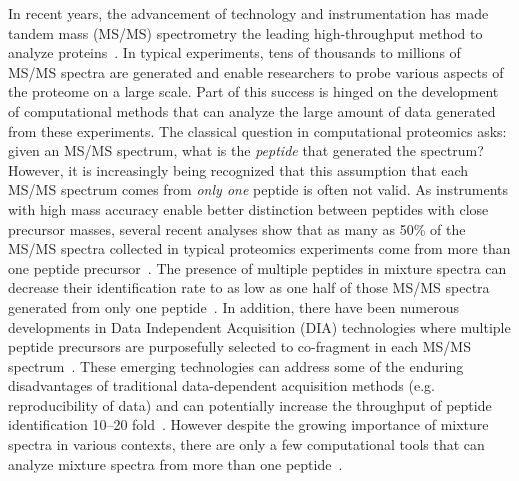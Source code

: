 \documentclass[runningheads,a4paper]{llncs}
\begin{document}
In recent years, the advancement of technology and instrumentation has made tandem mass (MS/MS) spectrometry the leading high-throughput method to analyze proteins~\cite{washburn2001large,brunner2007high,aebersold2003mass}.  In typical experiments, tens of thousands to millions of MS/MS spectra are generated and enable researchers to probe various aspects of the proteome on a large scale.  Part of this success is hinged on the development of computational methods that can analyze the large amount of data generated from these experiments. The classical question in computational proteomics asks: given an MS/MS spectrum, what is the \emph{peptide} that generated the spectrum? However, it is increasingly being recognized that this assumption that each MS/MS spectrum comes from \emph{only one} peptide is often not valid.  As instruments with high mass accuracy enable better distinction between peptides with close precursor masses, several recent analyses show that as many as 50\% of the MS/MS spectra collected in typical proteomics experiments come from more than one peptide precursor~\cite{pr101060v,pr800307m}. The presence of multiple peptides in mixture spectra can decrease their identification rate to as low as one half of those MS/MS spectra generated from only one peptide~\cite{gelio2008detect,houel2010quant,wang2011peptide}. In addition, there have been numerous developments in Data Independent Acquisition (DIA) technologies where multiple peptide precursors are purposefully selected to co-fragment in each MS/MS spectrum~\cite{masselon2003itp,venable2004aaq,plumb2006uplc,chakraborty2007uim,panchaud2009precursor,michalski2011mass,2012targeted}.  These emerging technologies can address some of the enduring disadvantages of traditional data-dependent acquisition methods (e.g. reproducibility of data) and can potentially increase the throughput of peptide identification 10--20 fold~\cite{pr101060v,blackburn2010improve}. However despite the growing importance of mixture spectra in various contexts, there are only a few computational tools that can analyze mixture spectra from more than one peptide~\cite{zhang2005tree,li2009database,bern2009deconvolution,wang2010msplit,wang2011peptide}.
\end{document}
